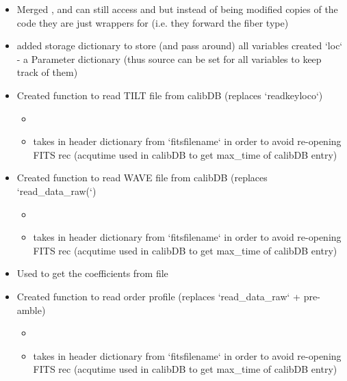 \begin{itemize}
\item Merged ,  and  can still access  and  but instead of being modified copies of the code they are just wrappers for  (i.e. they forward the fiber type)

\item added storage dictionary to store (and pass around) all variables created `loc` - a Parameter dictionary (thus source can be set for all variables to keep track of them)

\item Created function to read TILT file from calibDB (replaces `readkeyloco`)
    \begin{itemize}
	\item {}
	\item takes in header dictionary from `fitsfilename` in order to avoid re-opening FITS rec (acqutime used in calibDB to get max\_time of calibDB entry) 
    \end{itemize}

\item Created function to read WAVE file from calibDB (replaces `read\_data\_raw(`)
    \begin{itemize}
	\item {}
	\item takes in header dictionary from `fitsfilename` in order to avoid re-opening FITS rec (acqutime used in calibDB to get max\_time of calibDB entry) 
    \end{itemize}

\item Used  to get the coefficients from file

\item Created function to read order profile (replaces `read\_data\_raw` + pre-amble)
    \begin{itemize}
	\item {}
	\item takes in header dictionary from `fitsfilename` in order to avoid re-opening FITS rec (acqutime used in calibDB to get max\_time of calibDB entry) 
    \end{itemize}


\end{itemize}
